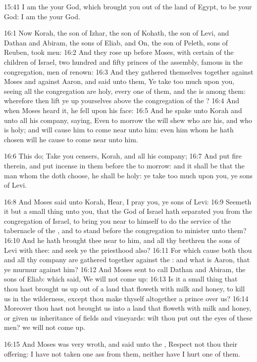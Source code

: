 15:41 I am the \LORD your God, which brought you out of the land of Egypt, to be your God: I am the \LORD your God.

16:1 Now Korah, the son of Izhar, the son of Kohath, the son of Levi, and Dathan and Abiram, the sons of Eliab, and On, the son of Peleth, sons of Reuben, took men: 16:2 And they rose up before Moses, with certain of the children of Israel, two hundred and fifty princes of the assembly, famous in the congregation, men of renown: 16:3 And they gathered themselves together against Moses and against Aaron, and said unto them, Ye take too much upon you, seeing all the congregation are holy, every one of them, and the \LORD is among them: wherefore then lift ye up yourselves above the congregation of the \LORD?  16:4 And when Moses heard it, he fell upon his face: 16:5 And he spake unto Korah and unto all his company, saying, Even to morrow the \LORD will shew who are his, and who is holy; and will cause him to come near unto him: even him whom he hath chosen will he cause to come near unto him.

16:6 This do; Take you censers, Korah, and all his company; 16:7 And put fire therein, and put incense in them before the \LORD to morrow: and it shall be that the man whom the \LORD doth choose, he shall be holy: ye take too much upon you, ye sons of Levi.

16:8 And Moses said unto Korah, Hear, I pray you, ye sons of Levi: 16:9 Seemeth it but a small thing unto you, that the God of Israel hath separated you from the congregation of Israel, to bring you near to himself to do the service of the tabernacle of the \LORD, and to stand before the congregation to minister unto them?  16:10 And he hath brought thee near to him, and all thy brethren the sons of Levi with thee: and seek ye the priesthood also?  16:11 For which cause both thou and all thy company are gathered together against the \LORD: and what is Aaron, that ye murmur against him?  16:12 And Moses sent to call Dathan and Abiram, the sons of Eliab: which said, We will not come up: 16:13 Is it a small thing that thou hast brought us up out of a land that floweth with milk and honey, to kill us in the wilderness, except thou make thyself altogether a prince over us?  16:14 Moreover thou hast not brought us into a land that floweth with milk and honey, or given us inheritance of fields and vineyards: wilt thou put out the eyes of these men? we will not come up.

16:15 And Moses was very wroth, and said unto the \LORD, Respect not thou their offering: I have not taken one ass from them, neither have I hurt one of them.

